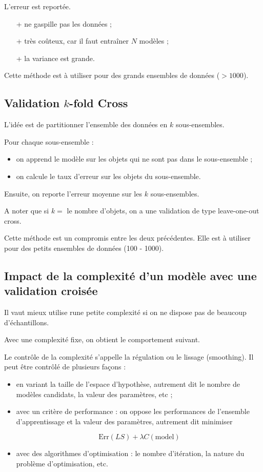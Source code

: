 L'erreur est reportée.

\begin{itemize}
	\item[+] ne gaspille pas les données ;
	\item[+] très coûteux, car il faut entraîner $N$ modèles ;
	\item[+] la variance est grande.
\end{itemize}

Cette méthode est à utiliser pour des grands ensembles de données ($> 1000$).

\subsection{Validation $k$-fold Cross}

L'idée est de partitionner l'ensemble des données en $k$ sous-ensembles.

Pour chaque sous-ensemble :

\begin{itemize}
	\item on apprend le modèle sur les objets qui ne sont pas dans le sous-ensemble ;
	\item on calcule le taux d'erreur sur les objets du sous-ensemble.
\end{itemize}

Ensuite, on reporte l'erreur moyenne sur les $k$ sous-ensembles.

A noter que si $k = $ le nombre d'objets, on a une validation de type leave-one-out cross.

Cette méthode est un compromis entre les deux précédentes. Elle est à utiliser pour des petits ensembles de données (100 - 1000).

\subsection{Impact de la complexité d'un modèle avec une validation croisée}


Il vaut mieux utilise rune petite complexité si on ne dispose pas de beaucoup d'échantillons.

Avec une complexité fixe, on obtient le comportement suivant.


Le contrôle de la complexité s'appelle la régulation ou le lissage (smoothing). Il peut être contrôlé de plusieurs façons :

\begin{itemize}
	\item en variant la taille de l'espace d'hypothèse, autrement dit le nombre de modèles candidats, la valeur des paramètres, etc ;
	\item avec un critère de performance : on oppose les performances de l'ensemble d'apprentissage et la valeur des paramètres, autrement dit minimiser
	
	$$\text{Err}(LS) + \lambda C(\text{model})$$
	
	\item avec des algorithmes d'optimisation : le nombre d'itération, la nature du problème d'optimisation, etc.
\end{itemize}

